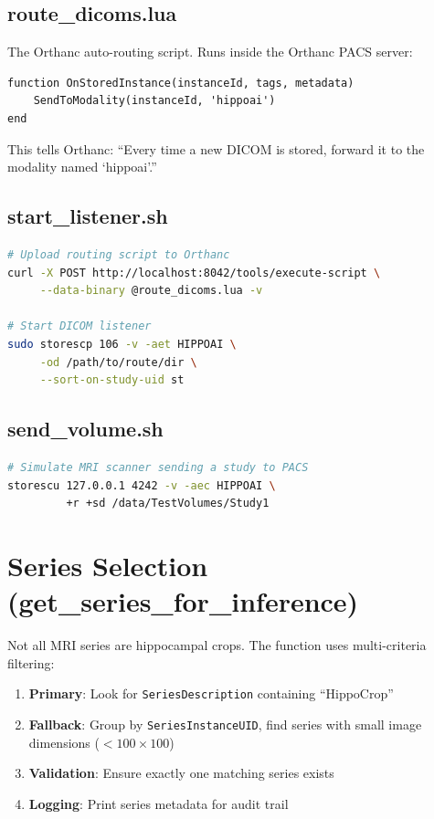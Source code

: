 \documentclass[12pt,a4paper]{report}
\begin{document}
\subsection{route\_dicoms.lua}
The Orthanc auto-routing script. Runs inside the Orthanc PACS server:
\begin{lstlisting}[language={[5.0]Lua}]
function OnStoredInstance(instanceId, tags, metadata)
    SendToModality(instanceId, 'hippoai')
end
\end{lstlisting}
This tells Orthanc: ``Every time a new DICOM is stored, forward it to the modality named `hippoai'.''

\subsection{start\_listener.sh}
\begin{lstlisting}[language=bash]
# Upload routing script to Orthanc
curl -X POST http://localhost:8042/tools/execute-script \
     --data-binary @route_dicoms.lua -v

# Start DICOM listener
sudo storescp 106 -v -aet HIPPOAI \
     -od /path/to/route/dir \
     --sort-on-study-uid st
\end{lstlisting}

\subsection{send\_volume.sh}
\begin{lstlisting}[language=bash]
# Simulate MRI scanner sending a study to PACS
storescu 127.0.0.1 4242 -v -aec HIPPOAI \
         +r +sd /data/TestVolumes/Study1
\end{lstlisting}

\section{Series Selection (get\_series\_for\_inference)}

Not all MRI series are hippocampal crops. The function uses multi-criteria filtering:

\begin{enumerate}
    \item \textbf{Primary}: Look for \texttt{SeriesDescription} containing ``HippoCrop''
    \item \textbf{Fallback}: Group by \texttt{SeriesInstanceUID}, find series with small image dimensions ($< 100 \times 100$)
    \item \textbf{Validation}: Ensure exactly one matching series exists
    \item \textbf{Logging}: Print series metadata for audit trail
\end{enumerate}
\end{document}
